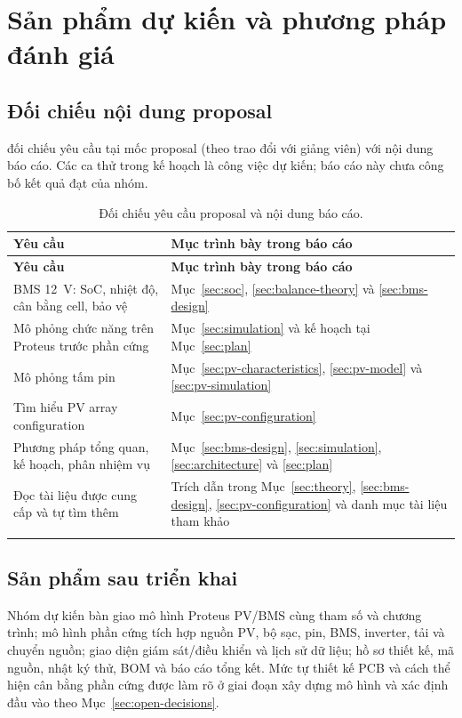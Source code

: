 \section{Sản phẩm dự kiến và phương pháp đánh giá}
\label{sec:evaluation}

\subsection{Đối chiếu nội dung proposal}

 đối chiếu yêu cầu tại mốc proposal (theo trao đổi với giảng viên) với nội dung báo cáo. Các ca thử trong kế hoạch là công việc dự kiến; báo cáo này chưa công bố kết quả đạt của nhóm.

\begin{longtable}{@{}p{6.5cm} p{8.0cm}@{}}
\toprule
\textbf{Yêu cầu} & \textbf{Mục trình bày trong báo cáo} \\
\midrule
\endfirsthead
\toprule
\textbf{Yêu cầu} & \textbf{Mục trình bày trong báo cáo} \\
\midrule
\endhead
BMS 12~V: SoC, nhiệt độ, cân bằng cell, bảo vệ & Mục~\ref{sec:soc}, \ref{sec:balance-theory} và \ref{sec:bms-design} \\
Mô phỏng chức năng trên Proteus trước phần cứng & Mục~\ref{sec:simulation} và kế hoạch tại Mục~\ref{sec:plan} \\
Mô phỏng tấm pin & Mục~\ref{sec:pv-characteristics}, \ref{sec:pv-model} và \ref{sec:pv-simulation} \\
Tìm hiểu PV array configuration & Mục~\ref{sec:pv-configuration} \\
Phương pháp tổng quan, kế hoạch, phân nhiệm vụ & Mục~\ref{sec:bms-design}, \ref{sec:simulation}, \ref{sec:architecture} và \ref{sec:plan} \\
Đọc tài liệu được cung cấp và tự tìm thêm & Trích dẫn trong Mục~\ref{sec:theory}, \ref{sec:bms-design}, \ref{sec:pv-configuration} và danh mục tài liệu tham khảo \\
\bottomrule
\caption{Đối chiếu yêu cầu proposal và nội dung báo cáo.}
\label{tab:req-map}
\end{longtable}

\subsection{Sản phẩm sau triển khai}

Nhóm dự kiến bàn giao mô hình Proteus PV/BMS cùng tham số và chương trình; mô hình phần cứng tích hợp nguồn PV, bộ sạc, pin, BMS, inverter, tải và chuyển nguồn; giao diện giám sát/điều khiển và lịch sử dữ liệu; hồ sơ thiết kế, mã nguồn, nhật ký thử, BOM và báo cáo tổng kết. Mức tự thiết kế PCB và cách thể hiện cân bằng phần cứng được làm rõ ở giai đoạn xây dựng mô hình và xác định đầu vào theo Mục~\ref{sec:open-decisions}.

